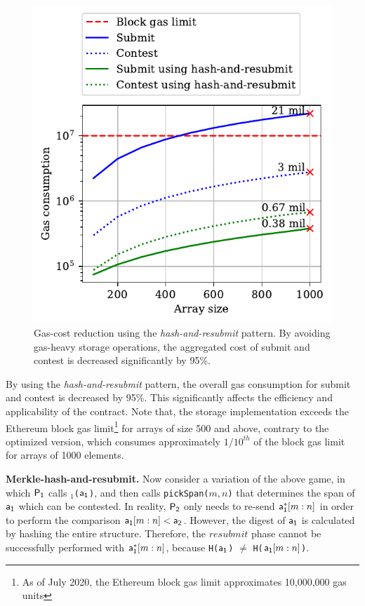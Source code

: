 \begin{figure}[h!]
\begin{center}
\includegraphics[width=1 \columnwidth]{figures/har-example.pdf}
\end{center}
\caption{Gas-cost reduction using the \emph{hash-and-resubmit} pattern. By
    avoiding gas-heavy storage operations, the aggregated cost of
    \textsf{submit} and \textsf{contest} is decreased significantly by 95\%.}
\label{fig:har-example}
\end{figure}

By using the \emph{hash-and-resubmit} pattern, the overall gas consumption for
\textsf{submit} and \textsf{contest} is decreased by 95\%. This
significantly affects the efficiency and applicability of the contract. Note
that, the storage implementation exceeds the Ethereum block gas
limit\footnote{As of July 2020, the Ethereum block gas limit approximates
10,000,000 gas units} for arrays of size 500 and above, contrary to the
optimized version, which consumes approximately $1/10^{th}$ of the block gas
limit for arrays of 1000 elements.

\noindent \textbf{Merkle-hash-and-resubmit.} Now consider a variation of the
above game, in which $\mathsf{P_1}$ calls \texttt{\proc$_1$(}$\mathsf{a_1}$\texttt{)}, and
then calls \texttt{pickSpan(}$m, n$\texttt{)} that determines the span of
$\mathsf{a_1}$ which can be contested. In reality, $\mathsf{P_2}$ only needs to re-send
$\mathsf{a_1^*}[m:n]$ in order to perform the comparison $\mathsf{a_1}[m:n] < \mathsf{a_2}$. However,
the digest of $\mathsf{a_1}$ is calculated by hashing the entire structure. Therefore,
the $resubmit$ phase cannot be successfully performed with $\mathsf{a_1^*}[m:n]$,
because \texttt{H(}$\mathsf{a_1}$\texttt{)} $\ne$ \texttt{H(}$\mathsf{a_1}[m:n]$\texttt{)}.

